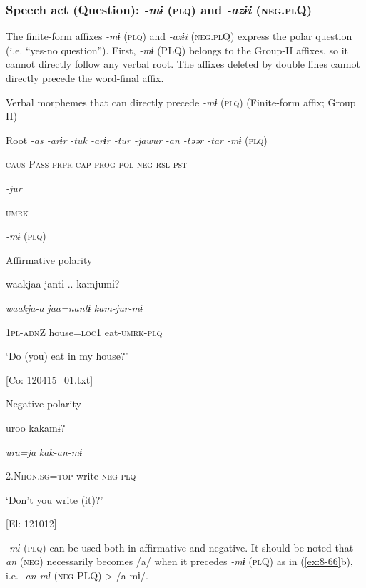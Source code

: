\subsubsection{Speech act (Question): \textit{{}-mɨ} (\textsc{plq}) and \textit{{}-azɨi} (\textsc{neg}.\textsc{pl}Q)}

The finite-form affixes \textit{{}-mɨ} (\textsc{plq}) and \textit{{}-azɨi} (\textsc{neg}.\textsc{pl}Q) express the polar question (i.e. “yes-no question”).   First, \textit{{}-mɨ} (PLQ) belongs to the Group-II affixes, so it cannot directly follow any verbal root. The affixes deleted by double lines cannot directly precede the word-final affix.

\ea\label{ex:8-65}
  Verbal morphemes that can directly precede \textit{-mɨ} (\textsc{plq}) (Finite-form affix; Group II)

  Root  \textit{{}-as  {}-arɨr} %
\textit{{}-tuk  {}-arɨr  {}-tur  {}-jawur} %
\textit{{}-an  {}-təər  {}-tar  {}-mɨ} (\textsc{plq})

    \textsc{caus}  P\textsc{ass}  \textsc{prpr}  \textsc{cap}  \textsc{prog}  \textsc{pol}  \textsc{neg}  \textsc{rsl}  \textsc{pst}

          \textit{{}-jur} 

          \textsc{umrk}

\ea\label{ex:8-66}
  \textit{{}-mɨ} (\textsc{plq})

\ea Affirmative polarity

  {\TM}
\glll  waakjaa  jantɨ ..  kamjumɨ?

    \textit{waakja-a}  \textit{jaa=nantɨ}  \textit{kam{}-jur-mɨ}

    1\textsc{pl}-\textsc{adn}Z  house=\textsc{loc}1  eat-\textsc{umrk}-\textsc{plq}

    ‘Do (you) eat in my house?’

    [Co: 120415\_01.txt]
\z

\ex Negative polarity

  {\TM}
\glll  uroo  kakamɨ?

    \textit{ura=ja}  \textit{kak-an-mɨ}

    2.N\textsc{hon}.\textsc{sg}=\textsc{top}  write-\textsc{neg}-\textsc{plq}

    ‘Don’t you write (it)?’

    [El: 121012]

\textit{{}-mɨ} (\textsc{plq}) can be used both in affirmative and negative. It should be noted that \textit{{}-an} (\textsc{neg}) necessarily becomes /a/ when it precedes \textit{{}-mɨ} (\textsc{pl}Q) as in (\ref{ex:8-66}b), i.e. \textit{{}-an-mɨ} (\textsc{neg}-PLQ) > /a-mɨ/.

